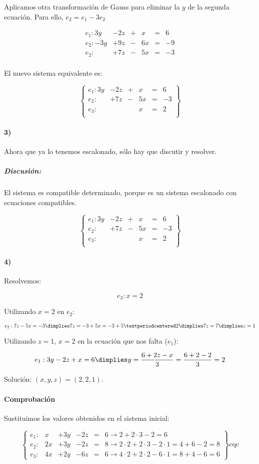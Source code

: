 \documentclass[palatino,nosec]{Docencia}
\begin{document}
\begin{problem}
Aplicamos otra transformación de Gauss para eliminar la $y$ de la segunda ecuación. Para ello, $e_2 = e_1-3e_2$

\[
\begin{array}{lccccc}
e_1: 3y&-2z&+&x&=&6\\
e_2: -3y&+9z&-&6x&=&-9\\
\hline
e_2: &+7z&-&5x&=&-3\\
\end{array}
\]	

El nuevo sistema equivalente es:

\[
\left\{\begin{array}{lccccc}
e_1: 3y&-2z&+&x&=&6\\
e_2: &+7z&-&5x&=&-3\\
e_3: &&&x&=&2\\
\end{array}\right\}
\]

\paragraph{3)}

Ahora que ya lo tenemos escalonado, sólo hay que discutir y resolver. 

\subparagraph*{Discusión:} El sistema es compatible determinado, porque es un sistema escalonado con ecuaciones compatibles.

\[
\left\{\begin{array}{lccccc}
e_1: 3y&-2z&+&x&=&6\\
e_2: &+7z&-&5x&=&-3\\
e_3: &&&x&=&2\\
\end{array}\right\}
\]


\paragraph{4)} Resolvemos:

\[e_3: x=2\]

Utilizando $x=2$ en $e_2$:


\[e_2: 7z-5x = -3 \dimplies 7z = -3+5x = -3+5·2 \dimplies 7z=7 \dimplies z=1\]

Utilizando $z=1$, $x=2$ en la ecuación que nos falta ($e_1$):

\[
e_1: 3y-2z+x=6 \dimplies y=\frac{6+2z-x}{3} = \frac{6+2-2}{3} = 2
\]


Solución: $(x,y,z) = (2,2,1)$.

\paragraph*{Comprobación}

Sustituimos los valores obtenidos en el sistema inicial:


\[
\left\{\begin{array}{lccccl}
e_1: &x&+3y&-2z&=&6 \to 2+2·3-2 = 6\\
e_2: &2x&+3y&-2z&=&8 \to 2·2 + 2·3-2·1 = 4+6-2 = 8\\
e_3: &4x&+2y&-6z&=&6 \to 4·2+2·2-6·1 = 8+4-6 = 6  
\end{array}\right\} \text{cqc}
\]
\end{problem}
\end{document}
